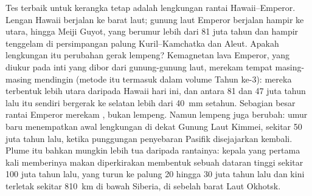 Tes terbaik untuk kerangka tetap adalah lengkungan rantai Hawaii--Emperor. Lengan Hawaii
berjalan ke barat laut; gunung laut Emperor berjalan hampir ke utara, hingga Meiji Guyot, yang
berumur lebih dari 81 juta tahun dan hampir tenggelam di persimpangan palung Kuril--Kamchatka dan
Aleut. Apakah lengkungan itu perubahan gerak lempeng? Kemagnetan lava Emperor, yang diukur pada
inti yang dibor dari gunung-gunung laut, merekam  tempat masing-masing mendingin (metode
itu termasuk dalam volume Tahun ke-3): mereka terbentuk lebih utara daripada Hawaii hari ini,
dan antara 81 dan 47 juta tahun lalu  itu sendiri bergerak ke selatan lebih dari
\qty{40}{mm} setahun. Sebagian besar rantai Emperor merekam , bukan lempeng. Namun lempeng
juga berubah: umur baru menempatkan awal lengkungan di dekat Gunung Laut Kimmei, sekitar 50 juta
tahun lalu, ketika punggungan penyebaran Pasifik disejajarkan kembali. Plume itu bahkan mungkin
lebih tua daripada rantainya: kepala yang pertama kali memberinya makan diperkirakan membentuk
sebuah dataran tinggi sekitar 100 juta tahun lalu, yang turun ke palung 20 hingga 30 juta tahun
lalu dan kini terletak sekitar \qty{810}{km} di bawah Siberia, di sebelah barat Laut Okhotsk.


